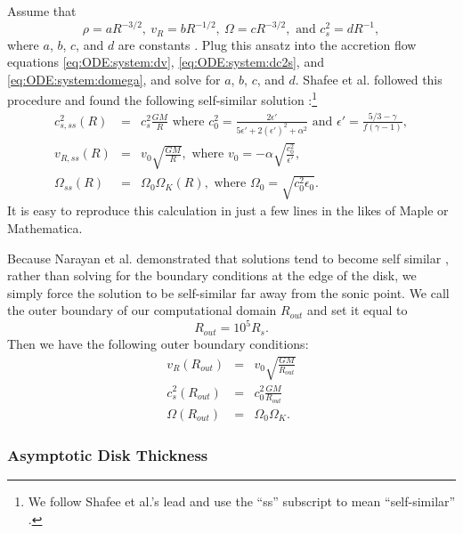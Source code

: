 \documentclass[]{article}
\begin{document}
Assume that
\begin{equation}
  \label{eq:self:similar}
  \rho = a R^{-3/2},\ v_R = b R^{-1/2},\ \Omega = c R^{-3/2},\text{ and }c_s^2 = d R^{-1},
\end{equation}
where $a$, $b$, $c$, and $d$ are constants
\cite{NarayanYi94}. Plug this ansatz into the accretion flow
equations \eqref{eq:ODE:system:dv}, \eqref{eq:ODE:system:dc2s}, and
\eqref{eq:ODE:system:domega}, and solve for $a$, $b$, $c$, and $d$. Shafee
et al. followed this procedure and found the following self-similar
solution \cite{Shafee08}:\footnote{We follow Shafee et al.'s lead and
  use the ``ss'' subscript to mean ``self-similar'' \cite{Shafee08}.}
\begin{eqnarray}
  \label{eq:self:similar:c2s}
  c_{s,ss}^2(R) &=& c_s^2 \frac{GM}{R} \text{ where } c_0^2 = \frac{2\epsilon '}{5\epsilon ' + 2(\epsilon ')^2 + \alpha^2}\text{ and }\epsilon ' = \frac{5/3-\gamma}{f(\gamma-1)},\\
  \label{eq:self:similar:v:R}
  v_{R,ss}(R) &=& v_0\sqrt{\frac{GM}{R}},\text{ where }v_0 = -\alpha\sqrt{\frac{c_0^2}{\epsilon '}},\\
  \label{eq:self:similar:omega}
  \Omega_{ss}(R) &=& \Omega_0\Omega_K(R),\text{ where }\Omega_0=\sqrt{c_0^2\epsilon_0}.
\end{eqnarray}
It is easy to reproduce this calculation in just a few lines in the
likes of Maple or Mathematica. 

Because Narayan et al. demonstrated that solutions tend to become self
similar \cite{Narayan97}, rather than solving for the boundary
conditions at the edge of the disk, we simply force the solution to be
self-similar far away from the sonic point. We call the outer boundary
of our computational domain $R_{out}$ and set it equal to
\begin{equation}
  \label{eq:def:R:out}
  R_{out} = 10^5 R_s.
\end{equation}
Then we have the following outer boundary conditions:
\begin{eqnarray}
  \label{eq:vr:rout}
  v_R(R_{out}) &=& v_0 \sqrt{\frac{GM}{R_{out}}}\\
  c_s^2(R_{out}) &=& c_0^2 \frac{GM}{R_{out}}\\
  \Omega(R_{out}) &=& \Omega_0\Omega_K.
\end{eqnarray}

\subsubsection{Asymptotic Disk Thickness}
\label{subsubsec:asymptotic:disk:thickness}
\end{document}
